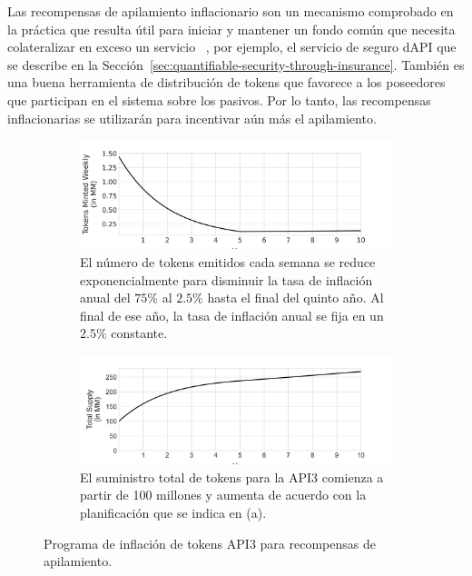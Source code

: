 \documentclass[11pt]{article}
\begin{document}
Las recompensas de apilamiento inflacionario son un mecanismo comprobado en la práctica que resulta útil para iniciar y mantener un fondo común que necesita colateralizar en exceso un servicio ~\cite{synthetix:2020}, por ejemplo, el servicio de seguro dAPI que se describe en la Sección~\ref{sec:quantifiable-security-through-insurance}.
También es una buena herramienta de distribución de tokens que favorece a los poseedores que participan en el sistema sobre los pasivos. Por lo tanto, las recompensas inflacionarias se utilizarán para incentivar aún más el apilamiento.

\begin{figure}[t]
     \centering
     \begin{subfigure}{0.9\textwidth}
         \centering
         \includegraphics[width=\textwidth]{fig/token-weekly-emission.pdf}
         \caption{El número de tokens emitidos cada semana se reduce exponencialmente para disminuir la tasa de inflación anual del  $75\%$ al $2.5\%$ hasta el final del quinto año. Al final de ese año, la tasa de inflación anual se fija en un $2.5\%$ constante.}
         \label{fig:token-emission}
     \end{subfigure}
     \begin{subfigure}{0.9\textwidth}
         \centering
         \includegraphics[width=\textwidth]{fig/token-total-supply.pdf}
         \caption{El suministro total de tokens para la API3 comienza a partir de 100 millones y aumenta de acuerdo con la planificación que se indica en (a).}
         \label{fig:total-supply}
     \end{subfigure}
    \caption{Programa de inflación de tokens API3 para recompensas de apilamiento.}
    \label{fig:token}
\end{figure}
\end{document}
